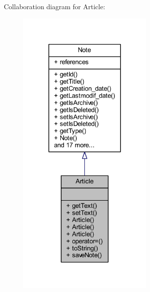 Collaboration diagram for Article\+:
\nopagebreak
\begin{figure}[H]
\begin{center}
\leavevmode
\includegraphics[width=191pt]{class_article__coll__graph}
\end{center}
\end{figure}
